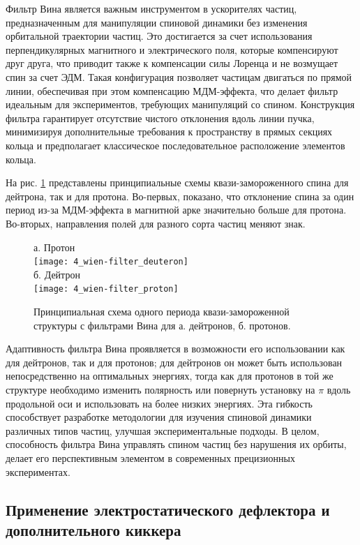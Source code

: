 \par Фильтр Вина является важным инструментом в ускорителях частиц, предназначенным для манипуляции спиновой динамики без изменения орбитальной траектории частиц. Это достигается за счет использования перпендикулярных магнитного и электрического поля, которые компенсируют друг друга, что приводит также к компенсации силы Лоренца и не возмущает спин за счет ЭДМ. Такая конфигурация позволяет частицам двигаться по прямой линии, обеспечивая при этом компенсацию МДМ-эффекта, что делает фильтр идеальным для экспериментов, требующих манипуляций со спином. Конструкция фильтра гарантирует отсутствие чистого отклонения вдоль линии пучка, минимизируя дополнительные требования к пространству в прямых секциях кольца и предполагает классическое последовательное расположение элементов кольца.

\par На рис. \ref{fig:wien-filter} представлены принципиальные схемы квази-замороженного спина для дейтрона, так и для протона. Во-первых, показано, что отклонение спина за один период из-за МДМ-эффекта в магнитной арке значительно больше для протона. Во-вторых, направления полей для разного сорта частиц меняют знак.

\begin{figure} [h!]
	\centering
	а. Протон\\
	\texttt{[image: 4\_wien-filter\_deuteron]}\\
	б. Дейтрон\\
	\texttt{[image: 4\_wien-filter\_proton]}
	\caption{Принципиальная схема одного периода квази-замороженной структуры с фильтрами Вина для а. дейтронов, б. протонов.}
	\label{fig:wien-filter}
\end{figure}

\par Адаптивность фильтра Вина проявляется в возможности его использовании как для дейтронов, так и для протонов; для дейтронов он может быть использован непосредственно на оптимальных энергиях, тогда как для протонов в той же структуре необходимо изменить полярность или повернуть установку на $\pi$ вдоль продольной оси и использовать на более низких энергиях. Эта гибкость способствует разработке методологии для изучения спиновой динамики различных типов частиц, улучшая экспериментальные подходы. В целом, способность фильтра Вина управлять спином частиц без нарушения их орбиты, делает его перспективным элементом в современных прецизионных  экспериментах.

	\subsection{Применение электростатического дефлектора и дополнительного киккера}

